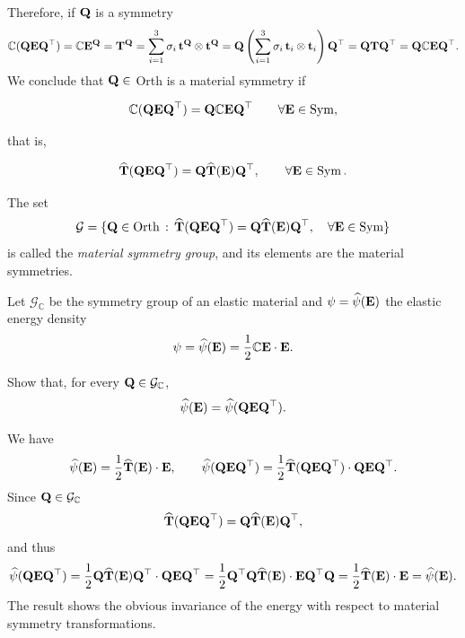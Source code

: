 Therefore, if $\mathbf{Q}$ is a symmetry
\begin{equation}
	\mathbb{C}(\mathbf{Q}\mathbf{E} \mathbf{Q}^\top)=\mathbb{C} \mathbf{E}^{\mathbf{Q}}=\mathbf{T}^{\mathbf{Q}}=\sum_{i=1}^{3}\sigma_i\, \mathbf{t}^{\mathbf{Q}}\otimes \mathbf{t}^{\mathbf{Q}}=\mathbf{Q} \left(  \sum_{i=1}^{3}\sigma_i\, \mathbf{t}_i\otimes \mathbf{t}_i \right)\mathbf{Q}^\top=\mathbf{Q} \mathbf{T} \mathbf{Q}^\top=\mathbf{Q}\mathbb{C} \mathbf{E} \mathbf{Q}^\top.
\end{equation}
We conclude that $\mathbf{Q}\in$ Orth is a material symmetry if
\begin{definition}
	\begin{equation}
		\mathbb{C}(\mathbf{Q}\mathbf{E} \mathbf{Q}^\top)=\mathbf{Q} \mathbb{C} \mathbf{E} \mathbf{Q} ^\top \qquad \forall \mathbf{E} \in \operatorname{Sym},
	\end{equation}
\end{definition}
that is,
\begin{definition}
	\begin{equation}
		\widehat{\mathbf{T}}(\mathbf{Q} \mathbf{E} \mathbf{Q} ^\top)=\mathbf{Q} \widehat{\mathbf{T}}(\mathbf{E})\mathbf{Q} ^\top, \qquad \forall \mathbf{E} \in \operatorname{Sym}.
	\end{equation}
\end{definition}

The set
\begin{equation}
	\mathcal{G} =\{ \mathbf{Q} \in {\rm Orth}\, :\, \widehat{\mathbf{T}}(\mathbf{Q} \mathbf{E} \mathbf{Q} ^\top)=\mathbf{Q} \widehat{\mathbf{T}}(\mathbf{E})\mathbf{Q} ^\top, \quad \forall \mathbf{E} \in \operatorname{Sym}  \}
\end{equation}
is called the \textit{material symmetry group}, and its elements are the material symmetries.

\begin{exercise}
	Let $\mathcal{G}_{\mathbb{C}}$ be the symmetry group of an elastic material and $\psi=\widehat\psi(\mathbf{E})$ the elastic energy density
	\begin{equation}
		\psi=\widehat\psi(\mathbf{E})=\frac12 \mathbb{C}\mathbf{E}\cdot\mathbf{E}.
	\end{equation}
	
	Show that, for every $\mathbf{Q}\in\mathcal{G}_{\mathbb{C}}$,
	\begin{equation}
		\widehat\psi(\mathbf{E})=	\widehat\psi(\mathbf{Q}\mathbf{E}\mathbf{Q}^\top).
	\end{equation}
	
	\begin{svolgimento}
		We have
		\begin{equation}
			\widehat{\psi}(\mathbf{E})=\frac{1}{2}\widehat{\mathbf{T}}(\mathbf{E})\cdot \mathbf{E}, \qquad \widehat{\psi}(\mathbf{Q}\mathbf{E}\mathbf{Q}^\top)=\frac{1}{2}\widehat{\mathbf{T}}(\mathbf{Q}\mathbf{E}\mathbf{Q}^\top)\cdot \mathbf{Q}\mathbf{E}\mathbf{Q}^\top.
		\end{equation}
		Since $\mathbf{Q} \in \mathcal{G}_{\mathbb{C}}$
		\begin{equation}
			\widehat{\mathbf{T}}(\mathbf{Q}\mathbf{E}\mathbf{Q}^\top)=\mathbf{Q}\widehat{\mathbf{T}}(\mathbf{E})\mathbf{Q}^\top,
		\end{equation}
		and thus
		\begin{equation}
			\widehat{\psi}(\mathbf{Q}\mathbf{E}\mathbf{Q}^\top)=\frac12\mathbf{Q}\widehat{\mathbf{T}}(\mathbf{E})\mathbf{Q}^\top\cdot  \mathbf{Q}\mathbf{E}\mathbf{Q}^\top=\frac12 \mathbf{Q}^\top\mathbf{Q} \widehat{\mathbf{T}}(\mathbf{E})\cdot \mathbf{E} \mathbf{Q}^\top\mathbf{Q}=\frac{1}{2}\widehat{\mathbf{T}}(\mathbf{E})\cdot \mathbf{E}=\widehat{\psi}(\mathbf{E}).
		\end{equation}
		The result shows the obvious invariance of the energy with respect to material symmetry transformations.
	\end{svolgimento}
	
\end{exercise}


